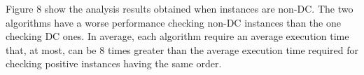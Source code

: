\documentclass[a4paper,11pt]{article}
\begin{document}
% 
% 
% 
% 
% 
% 
% 



Figure 8 show the analysis results obtained when instances are non-DC.
The two algorithms have a worse performance checking non-DC instances than the one checking DC ones. 
In average, each algorithm require an average execution time that, at most, can be 8 times greater than the average execution time required for checking positive instances having the same order.
\end{document}
